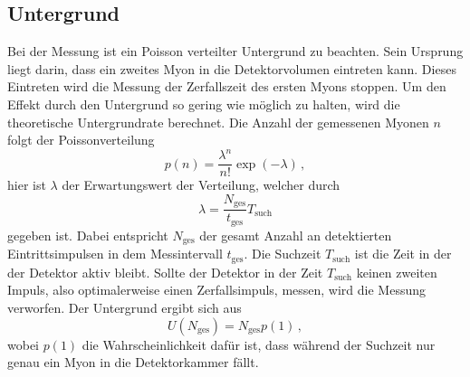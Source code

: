 \subsection{Untergrund}
Bei der Messung ist ein Poisson verteilter Untergrund zu beachten.
Sein Ursprung liegt darin, dass ein zweites Myon in die Detektorvolumen eintreten kann.
Dieses Eintreten wird die Messung der Zerfallszeit des ersten Myons stoppen.
Um den Effekt durch den Untergrund so gering wie möglich zu halten, wird die theoretische Untergrundrate berechnet.
Die Anzahl der gemessenen Myonen $n$ folgt der Poissonverteilung
\begin{equation*}
    p(n) = \frac{\lambda^n}{n!} \exp(-\lambda)\, ,
\end{equation*}
hier ist $\lambda$ der Erwartungswert der Verteilung, welcher durch 
\begin{equation*}
    \lambda = \frac{N_\text{ges}}{t_\text{ges}} T_\text{such}
\end{equation*}
gegeben ist.
Dabei entspricht $N_\text{ges}$ der gesamt Anzahl an detektierten Eintrittsimpulsen in dem Messintervall $t_\text{ges}$.
Die Suchzeit $T_\text{such}$ ist die Zeit in der der Detektor aktiv bleibt.
Sollte der Detektor in der Zeit $T_\text{such}$ keinen zweiten Impuls, also optimalerweise einen Zerfallsimpuls, messen, wird die Messung verworfen.
Der Untergrund ergibt sich aus 
\begin{equation}
    U(N_\text{ges}) = N_\text{ges} p(1)\, ,
    \label{eq:untergrund}
\end{equation}
wobei $p(1)$ die Wahrscheinlichkeit dafür ist, dass während der Suchzeit nur genau ein Myon in die Detektorkammer fällt.